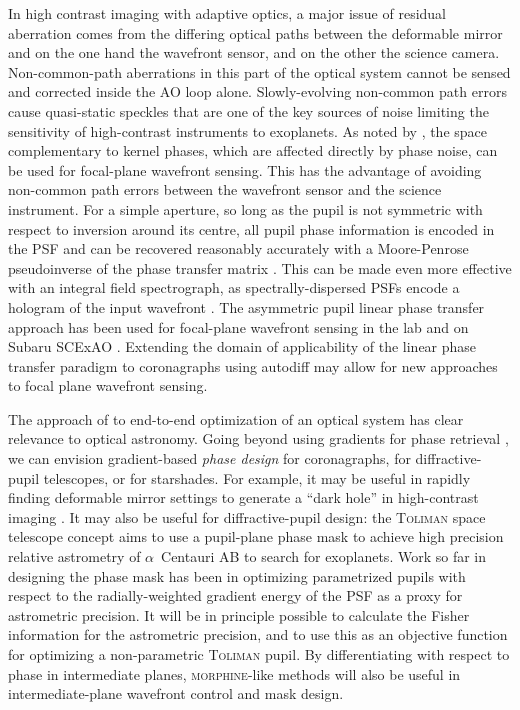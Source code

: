 \documentclass[modern]{aastex63}
\begin{document}
In high contrast imaging with adaptive optics, a major issue of residual aberration comes from the differing optical paths between the deformable mirror and on the one hand the wavefront sensor, and on the other the science camera. Non-common-path aberrations in this part of the optical system cannot be sensed and corrected inside the AO loop alone. Slowly-evolving non-common path errors cause quasi-static speckles that are one of the key sources of noise limiting the sensitivity of high-contrast instruments to exoplanets. As noted by \citet{martinache13}, the space complementary to kernel phases, which are affected directly by phase noise, can be used for focal-plane wavefront sensing. This has the advantage of avoiding non-common path errors between the wavefront sensor and the science instrument. For a simple aperture, so long as the pupil is not symmetric with respect to inversion around its centre, all pupil phase information is encoded in the PSF and can be recovered reasonably accurately with a Moore-Penrose pseudoinverse of the phase transfer matrix \citep{moore1920,bjerhammar1951,penrose_1955}. This can be made even more effective with an integral field spectrograph, as spectrally-dispersed PSFs encode a hologram of the input wavefront \citep{martinache16}. The asymmetric pupil linear phase transfer approach has been used for focal-plane wavefront sensing in the lab \citep[e.g.][]{pope14,swift} and on Subaru SCExAO \citep{martinache16b}. Extending the domain of applicability of the linear phase transfer paradigm to coronagraphs using autodiff may allow for new approaches to focal plane wavefront sensing. 

The approach of \citet{sitzmann2018} to end-to-end optimization of an optical system has clear relevance to optical astronomy. Going beyond using gradients for phase retrieval \citep{jurling14}, we can envision gradient-based \textit{phase design} for coronagraphs,  for diffractive-pupil telescopes, or for starshades. For example, it may be useful in rapidly finding deformable mirror settings to generate a ``dark hole'' in high-contrast imaging \citep[e.g.][]{malbet95,currie20}. It may also be useful for diffractive-pupil design: the \textsc{Toliman} space telescope concept \citep{tuthill18,bendek18} aims to use a pupil-plane phase mask to achieve high precision relative astrometry of $\alpha$~Centauri AB to search for exoplanets. Work so far in designing the phase mask has been in optimizing parametrized pupils with respect to the radially-weighted gradient energy of the PSF as a proxy for astrometric precision. It will be in principle possible to calculate the Fisher information for the astrometric precision, and to use this as an objective function for optimizing a non-parametric \textsc{Toliman} pupil. By differentiating with respect to phase in intermediate planes, \textsc{morphine}-like methods will also be useful in intermediate-plane wavefront control and mask design.
\end{document}
